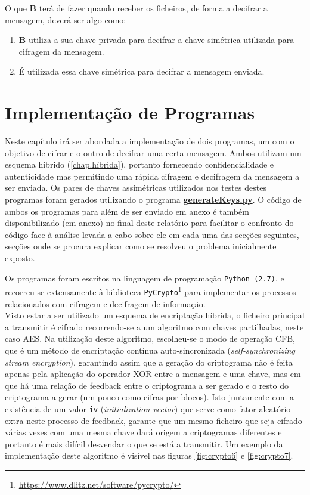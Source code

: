 \documentclass[a4paper,11pt,openright,oneside]{report}
\begin{document}
O que \textbf{B} terá de fazer quando receber os ficheiros, de forma a decifrar a mensagem, deverá ser algo como:

\begin{enumerate}
\item \textbf{B} utiliza a sua chave privada para decifrar a chave simétrica utilizada para cifragem da mensagem.
\item É utilizada essa chave simétrica para decifrar a mensagem enviada.
\end{enumerate}

\chapter{Implementação de Programas}
\label{chap.programas}

Neste capítulo irá ser abordada a implementação de dois programas, um com o objetivo de cifrar e o outro de decifrar uma certa mensagem. Ambos utilizam um esquema híbrido (\ref{chap.híbrida}), portanto fornecendo confidencialidade e autenticidade mas permitindo uma rápida cifragem e decifragem da mensagem a ser enviada. Os pares de chaves assimétricas utilizados nos testes destes programas foram gerados utilizando o programa \href{run:../Python/KeysGenerator/generateKeys.py}{\textbf{generateKeys.py}}. O código de ambos os programas para além de ser enviado em anexo é também disponibilizado (em anexo) no final deste relatório para facilitar o confronto do código face à análise levada a cabo sobre ele em cada uma das secções seguintes, secções onde se procura explicar como se resolveu o problema inicialmente exposto.

Os programas foram escritos na linguagem de programação \verb|Python (2.7)|, e recorreu-se extensamente à biblioteca \verb|PyCrypto|\footnote{\url{https://www.dlitz.net/software/pycrypto/}} para implementar os processos relacionados com cifragem e decifragem de informação.\\


Visto estar a ser utilizado um esquema de encriptação híbrida, o ficheiro principal a transmitir é cifrado recorrendo-se a um algoritmo com chaves partilhadas, neste caso AES. Na utilização deste algoritmo, escolheu-se o modo de operação CFB, que é um método de encriptação contínua auto-sincronizada (\textit{self-synchronizing stream encryption}), garantindo assim que a geração do criptograma não é feita apenas pela aplicação do operador XOR entre a mensagem e uma chave, mas em que há uma relação de feedback entre o criptograma a ser gerado e o resto do criptograma a gerar (um pouco como cifras por blocos). Isto juntamente com a existência de um valor 	\verb|iv| (\textit{initialization vector}) que serve como fator aleatório extra neste processo de feedback, garante que um mesmo ficheiro que seja cifrado várias vezes com uma mesma chave dará origem a criptogramas diferentes e portanto é mais difícil desvendar o que se está a transmitir. Um exemplo da implementação deste algoritmo é visível nas figuras \ref{fig:crypto6} e \ref{fig:crypto7}.
\end{document}
